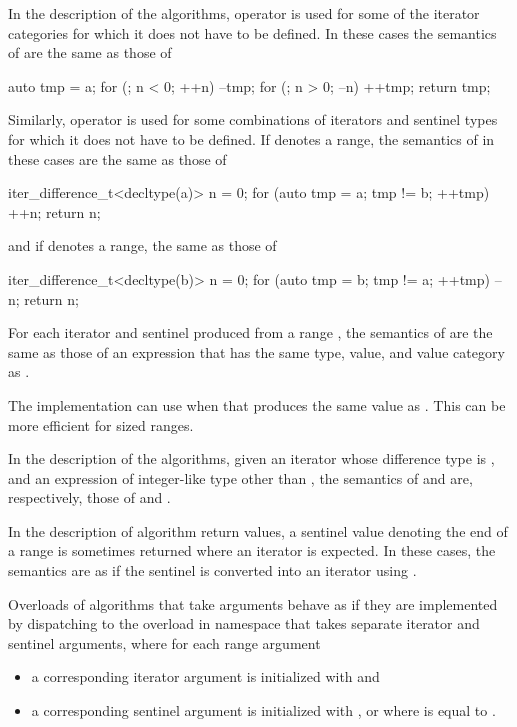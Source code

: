 \pnum
In the description of the algorithms, operator \tcode{+}
is used for some of the iterator categories
for which it does not have to be defined.
In these cases the semantics of  are the same as those of
\begin{codeblock}
auto tmp = a;
for (; n < 0; ++n) --tmp;
for (; n > 0; --n) ++tmp;
return tmp;
\end{codeblock}
Similarly, operator \tcode{-} is used
for some combinations of iterators and sentinel types
for which it does not have to be defined.
If  denotes a range,
the semantics of  in these cases are the same as those of
\begin{codeblock}
iter_difference_t<decltype(a)> n = 0;
for (auto tmp = a; tmp != b; ++tmp) ++n;
return n;
\end{codeblock}
and if  denotes a range, the same as those of
\begin{codeblock}
iter_difference_t<decltype(b)> n = 0;
for (auto tmp = b; tmp != a; ++tmp) --n;
return n;
\end{codeblock}
For each iterator  and sentinel 
produced from a range ,
the semantics of 
are the same as those of an expression that
has the same type, value, and value category
as .
\begin{note}
The implementation can use 
when that produces the same value as .
This can be more efficient for sized ranges.
\end{note}

\pnum
In the description of the algorithms,
given an iterator  whose difference type is , and
an expression  of integer-like type other than \cv{} ,
the semantics of  and  are, respectively,
those of  and .

\pnum
In the description of algorithm return values,
a sentinel value  denoting the end of a range 
is sometimes returned where an iterator is expected.
In these cases,
the semantics are as if the sentinel is converted into an iterator using
.

\pnum
Overloads of algorithms that take  arguments
behave as if they are implemented by
dispatching to the overload in namespace 
that takes separate iterator and sentinel arguments,
where for each range argument 
\begin{itemize}
\item
  a corresponding iterator argument is initialized with  and
\item
  a corresponding sentinel argument is initialized with ,
  or 
  where  is equal to .
\end{itemize}

